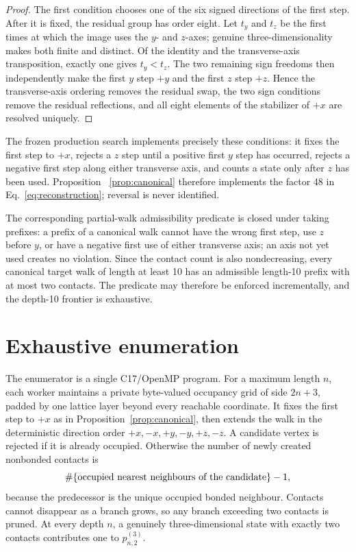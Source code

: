 \documentclass[11pt]{article}
\theoremstyle{definition}
\theoremstyle{remark}
\begin{document}
\begin{proof}
The first condition chooses one of the six signed directions of the first
step.  After it is fixed, the residual group has order eight.  Let $t_y$ and
$t_z$ be the first times at which the image uses the $y$- and $z$-axes;
genuine three-dimensionality makes both finite and distinct.  Of the identity
and the transverse-axis transposition, exactly one gives $t_y<t_z$.  The two
remaining sign freedoms then independently make the first $y$ step
$+y$ and the first $z$ step $+z$.  Hence the transverse-axis ordering removes
the residual swap, the two sign conditions remove the residual reflections,
and all eight elements of the stabilizer of $+x$ are resolved uniquely.
\end{proof}

The frozen production search implements precisely these conditions: it fixes
the first step to $+x$, rejects a $z$ step until a positive first $y$ step has
occurred, rejects a negative first step along either transverse axis, and
counts a state only after $z$ has been used.  Proposition~
\ref{prop:canonical} therefore implements the factor 48 in
Eq.~\eqref{eq:reconstruction}; reversal is never identified.

The corresponding partial-walk admissibility predicate is closed under taking
prefixes: a prefix of a canonical walk cannot have the wrong first step, use
$z$ before $y$, or have a negative first use of either transverse axis; an axis
not yet used creates no violation.  Since the contact count is also
nondecreasing, every canonical target walk of length at least 10 has an
admissible length-10 prefix with at most two contacts.  The predicate may
therefore be enforced incrementally, and the depth-10 frontier is exhaustive.

\section{Exhaustive enumeration}

The enumerator is a single C17/OpenMP program.  For a maximum length $n$, each
worker maintains a private byte-valued occupancy grid of side $2n+3$, padded
by one lattice layer beyond every reachable coordinate.  It fixes the first
step to $+x$ as in Proposition~\ref{prop:canonical}, then extends the walk in
the deterministic direction order $+x,-x,+y,-y,+z,-z$.  A candidate vertex is
rejected if it is already occupied.  Otherwise the number of newly created
nonbonded contacts is
\[
 \#\{\hbox{occupied nearest neighbours of the candidate}\}-1,
\]
because the predecessor is the unique occupied bonded neighbour.  Contacts
cannot disappear as a branch grows, so any branch exceeding two contacts is
pruned.  At every depth $n$, a genuinely three-dimensional state with exactly
two contacts contributes one to $p_{n,2}^{(3)}$.
\end{document}
